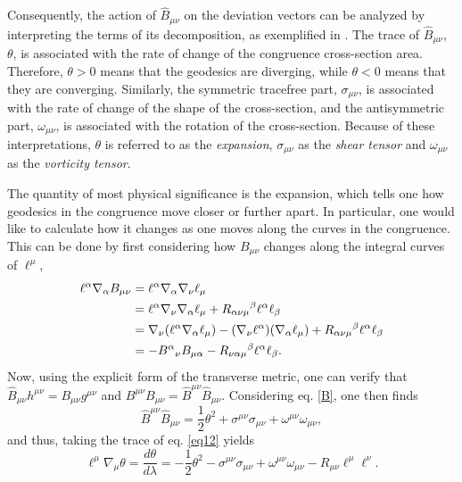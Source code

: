 \documentclass[
12pt,		%
openright,	%
twoside,  %
a4paper,			%
chapter=TITLE,		%
english,			%
french,				%
spanish,			%
brazil				%
]{USPSC-classe/USPSC}
\begin{document}
Consequently, the action of $\hat{B}_{\mu\nu}$ on the deviation vectors can be analyzed by interpreting the terms of its decomposition, as exemplified in \cite{Poisson2004}. The trace of $\hat{B}_{\mu\nu}$, $\theta$, is associated with the rate of change of the congruence cross-section area. Therefore, $\theta>0$ means that the geodesics are diverging, while $\theta<0$ means that they are converging. Similarly, the symmetric tracefree part, $\sigma_{\mu\nu}$, is associated with the rate of change of the shape of the cross-section, and the antisymmetric part, $\omega_{\mu\nu}$, is associated with the rotation of the cross-section. Because of these interpretations, $\theta$ is referred to as the \textit{expansion}, $\sigma_{\mu\nu}$ as the \textit{shear tensor} and $\omega_{\mu\nu}$ as the \textit{vorticity tensor}.

The quantity of most physical significance is the expansion, which tells one how geodesics in the congruence move closer or further apart. In particular, one would like to calculate how it changes as one moves along the curves in the congruence. This can be done by first considering how $B_{\mu\nu}$ changes along the integral curves of $\ell^{\mu}$,
\begin{equation}\label{eq12}
\begin{aligned}[b]
    \ell^{\alpha}\nabla_{\alpha}B_{\mu\nu} &=\ell^{\alpha}\nabla_{\alpha}\nabla_{\nu}\ell_{\mu}\\&=\ell^{\alpha}\nabla_{\nu}\nabla_{\alpha}\ell_{\mu}+R_{\alpha\nu\mu}\mathstrut^{\beta}\ell^{\alpha}\ell_{\beta}\\
    & = \nabla_{\nu}(\ell^{\alpha}\nabla_{\alpha}\ell_{\mu})-(\nabla_{\nu}\ell^{\alpha})(\nabla_{\alpha}\ell_{\mu})+R_{\alpha\nu\mu}\mathstrut^{\beta}\ell^{\alpha}\ell_{\beta} \\
    & = -B^{\alpha}\mathstrut_{\nu}B_{\mu\alpha}-R_{\nu\alpha\mu}\mathstrut^{\beta}\ell^{\alpha}\ell_{\beta}.
\end{aligned}
\end{equation}
Now, using the explicit form of the transverse metric, one can verify that $\hat{B}_{\mu\nu}h^{\mu\nu}=B_{\mu\nu}g^{\mu\nu}$ and $B^{\mu\nu}B_{\mu\nu}=\hat{B}^{\mu\nu}\hat{B}_{\mu\nu}$. Considering eq. \ref{B}, one then finds
\begin{equation}
    \hat{B}^{\mu\nu}\hat{B}_{\mu\nu}=\frac{1}{2}\theta^2+\sigma^{\mu\nu}\sigma_{\mu\nu}+\omega^{\mu\nu}\omega_{\mu\nu},
\end{equation}
and thus, taking the trace of eq. \ref{eq12} yields 
\begin{equation}\label{eq13}
    \ell^{\mu}\nabla_{\mu}\theta=\frac{d\theta}{d\lambda}=-\frac{1}{2}\theta^2-\sigma^{\mu\nu}\sigma_{\mu\nu}+\omega^{\mu\nu}\omega_{\mu\nu}-R_{\mu\nu}\ell^{\mu}\ell^{\nu}.
\end{equation}
\end{document}
